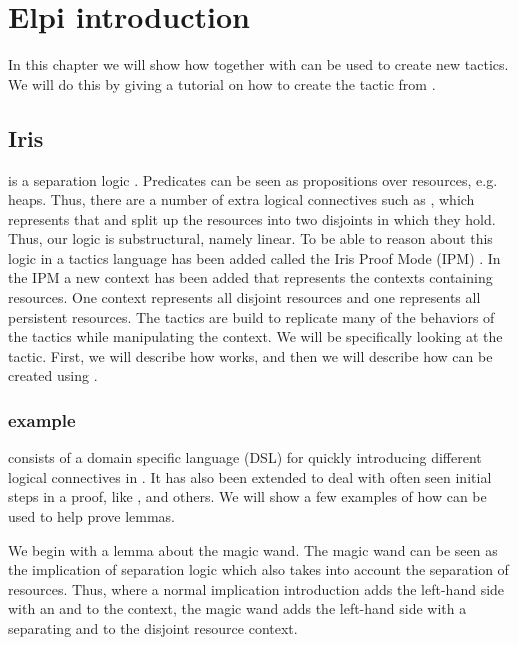 \documentclass[thesis.tex]{subfiles}
\begin{document}
\chapter{Elpi introduction}
In this chapter we will show how \elpi together with \ce can be used to create new tactics. We will do this by giving a tutorial on how to create the  tactic from \iris.

\section[Iris iIntros]{Iris }
\iris is a separation logic \cite*{jungIrisMonoidsInvariants2015a,jungHigherorderGhostState2016,krebbersEssenceHigherOrderConcurrent2017,jungIrisGroundModular2018}. Predicates can be seen as propositions over resources, e.g. heaps. Thus, there are a number of extra logical connectives such as , which represents that  and  split up the resources into two disjoints in which they hold. Thus, our logic is substructural, namely linear. To be able to reason about this logic in \coq a tactics language has been added called the Iris Proof Mode (IPM) \cite*{krebbersInteractiveProofsHigherorder2017,krebbersMoSeLGeneralExtensible2018}. In the IPM a new context has been added that represents the contexts containing resources. One context represents all disjoint resources and one represents all persistent resources. The tactics are build to replicate many of the behaviors of the \coq tactics while manipulating the \iris context. We will be specifically looking at the  tactic. First, we will describe how  works, and then we will describe how  can be created using \elpi.

\subsection[iIntros example]{ example}
 consists of a domain specific language (DSL) for quickly introducing different logical connectives in \iris. It has also been extended to deal with often seen initial steps in a proof, like ,  and others. We will show a few examples of how  can be used to help prove lemmas.

We begin with a lemma about the magic wand. The magic wand can be seen as the implication of separation logic which also takes into account the separation of resources. Thus, where a normal implication introduction adds the left-hand side with an and to the context, the magic wand adds the left-hand side with a separating and to the disjoint resource context.
\end{document}
